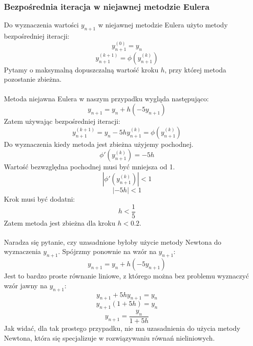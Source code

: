 \documentclass{article}
\begin{document}
\subsubsection{Bezpośrednia iteracja w niejawnej metodzie Eulera}
Do wyznaczenia wartości $y_{n+1}$ w niejawnej metodzie Eulera użyto metody bezpośredniej iteracji:
$$y_{n+1}^{(0)} = y_n$$
$$y_{n+1}^{(k+1)} =\phi(y_{n+1}^{(k)})$$
Pytamy o maksymalną dopuszczalną wartość kroku $h$, przy której metoda pozostanie zbieżna.
\\\\
Metoda niejawna Eulera w naszym przypadku wygląda następująco:
$$y_{n+1} = y_n + h(-5y_{n+1})$$
Zatem używając bezpośredniej iteracji:
$$y_{n+1}^{(k+1)} = y_n - 5hy_{n+1}^{(k)} = \phi(y_{n+1}^{(k)})$$
Do wyznaczenia kiedy metoda jest zbieżna użyjemy pochodnej.
$$\phi'(y_{n+1}^{(k)}) = -5h$$
Wartość bezwzględna pochodnej musi być mniejsza od 1.
$$|\phi'(y_{n+1}^{(k)})| < 1$$
$$|-5h| < 1$$
Krok musi być dodatni:
$$h < \frac{1}{5}$$
Zatem metoda jest zbieżna dla kroku $h < 0.2$.
\\\\
Naradza się pytanie, czy uzasadnione byłoby użycie metody Newtona do wyznaczenia $y_{n+1}$. Spójrzmy ponownie na wzór na $y_{n+1}$:
$$y_{n+1} = y_n + h(-5y_{n+1})$$
Jest to bardzo proste równanie liniowe, z którego można bez problemu wyznaczyć wzór jawny na $y_{n+1}$:
$$y_{n+1} + 5hy_{n+1} = y_n$$
$$y_{n+1}(1 + 5h) = y_n$$
$$y_{n+1}= \frac{y_n}{1 + 5h}$$
Jak widać, dla tak prostego przypadku, nie ma uzasadnienia do użycia metody Newtona, która się specjalizuje w rozwiązywaniu równań nieliniowych.
\end{document}
